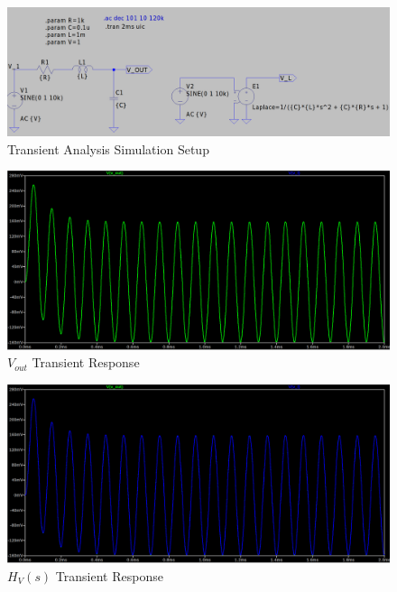 \begin{figure}[h]
    \centering
    \includegraphics[width=1\textwidth, height=0.4\textheight]{assets/rlc-transient-sim.png}
    \caption{Transient Analysis Simulation Setup}
    \label{fig:transient_analysis}
\end{figure}

\newpage
\thispagestyle{plain}

\begin{figure}[h]
    \centering
    \includegraphics[width=1\textwidth]{assets/rlc-sin-transient-out.png}
    \caption{$V_{out}$ Transient Response}
    \label{fig:rlc_v_out_transient}
\end{figure}

\begin{figure}[h]
    \centering
    \includegraphics[width=1\textwidth]{assets/rlc-sin-transient-laplace.png}
    \caption{$H_{V}(s)$ Transient Response}
    \label{fig:rlc_v_laplace_transient}
\end{figure}

